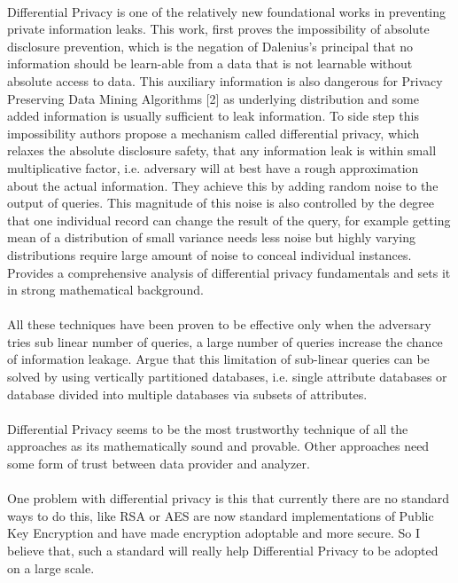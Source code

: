 \documentclass{report}
\begin{document}
\paragraph{}
Differential Privacy \cite{Dwork:2006:DP:2097282.2097284} is one of the relatively new foundational works in preventing private information leaks. This work, first proves the impossibility of absolute disclosure prevention, which is the negation of Dalenius’s principal that no information should be learn-able from a data that is not learnable without absolute access to data. This auxiliary information is also dangerous for Privacy Preserving Data Mining Algorithms [2] as underlying distribution and some added information is usually sufficient to leak information.
To side step this impossibility authors propose a mechanism called differential privacy, which relaxes the absolute disclosure safety, that any information leak is within small multiplicative factor, i.e. adversary will at best have a rough approximation about the actual information. They achieve this by adding random noise to the output of queries. This magnitude of this noise is also controlled by the degree that one individual record can change the result of the query, for example getting mean of a distribution of small variance needs less noise but highly varying distributions require large amount of noise to conceal individual instances. \cite{dwork2014algorithmic} Provides a comprehensive analysis of differential privacy fundamentals and sets it in strong mathematical background. 
\paragraph{}
All these techniques have been proven to be effective only when the adversary tries sub linear number of queries, a large number of queries increase the chance of information leakage\cite{haeberlen2011differential}. \cite{dwork2004privacy} Argue that this limitation of sub-linear queries can be solved by using vertically partitioned databases, i.e. single attribute databases or database divided into multiple databases via subsets of attributes.
\paragraph{}
Differential Privacy seems to be the most trustworthy technique of all the approaches as its mathematically sound and provable. Other approaches need some form of trust between data provider and analyzer.
\paragraph{}
One problem with differential privacy is this that currently there are no standard ways to do this, like RSA or AES are now standard implementations of Public Key Encryption and have made encryption adoptable and more secure. So I believe that, such a standard will really help Differential Privacy to be adopted on a large scale.
\end{document}
